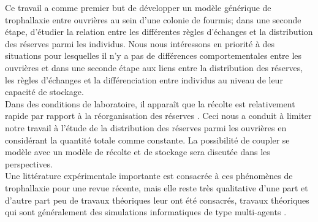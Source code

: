Ce travail a comme premier but de développer un modèle générique de trophallaxie entre ouvrières au sein d'une colonie de fourmis; dans une seconde étape, d'étudier la relation entre les différentes règles d'échanges et la distribution des réserves parmi les individus. Nous nous intéressons en priorité à des situations pour lesquelles il n'y a pas de différences comportementales entre les ouvrières et dans une seconde étape aux liens entre la distribution des réserves, les règles d'échanges et la différenciation entre individus au niveau de leur capacité de stockage.\\

Dans des conditions de laboratoire, il apparaît que la récolte est relativement rapide par rapport à la réorganisation des réserves  \citep{buffin_feeding_2009,buffin_collective_2012}. Ceci nous a conduit à limiter notre travail à l'étude de la distribution des réserves parmi les ouvrières en considérant la quantité totale comme constante. La possibilité de coupler se modèle avec un modèle de récolte et de stockage sera discutée dans les perspectives.\\

Une littérature expérimentale importante est consacrée à ces phénomènes de trophallaxie \citep{richard_intracolony_2013} pour une revue récente, mais elle reste très qualitative d'une part et d'autre part peu de travaux théoriques leur ont été consacrés, travaux théoriques qui sont généralement des simulations informatiques de type multi-agents \citep{schmickl_trophallaxis_2007}.

%
%
%

